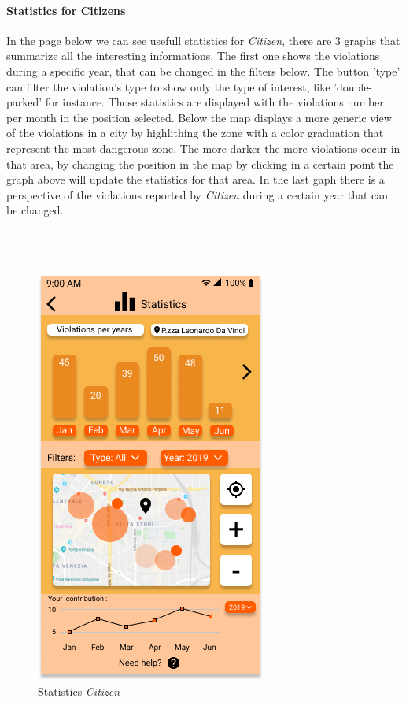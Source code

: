 \documentclass{article}
\begin{document}
\paragraph{Statistics for Citizens}
In the page below we can see usefull statistics for \textit{Citizen}, there are 3 graphs that summarize all the interesting
informations. The first one shows the violations during a specific year, that can be changed in the filters below. 
The button 'type' can filter the violation's type to show only the type of interest, like 'double-parked' for instance. 
Those statistics are displayed with the violations number per month in the position selected. Below the map displays
a more generic view of the violations in a city by highlithing the zone with a color graduation that represent the most
dangerous zone. The more darker the more violations occur in that area, by changing the position in the map by clicking 
in a certain point the graph above will update the statistics for that area.  In the last gaph there is a perspective of 
the violations reported by \textit{Citizen} during a certain year that can be changed.
\\
\\
\\
\\
\begin{figure}[H]
    \centering
    \includegraphics[scale=0.5]{img/mockups/statistics_citizen.png}
    \caption{Statistics \textit{Citizen}}
\end{figure}
\end{document}
